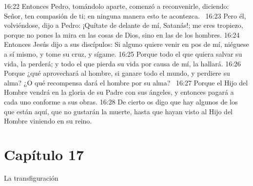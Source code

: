 16:22 Entonces Pedro, tomándolo aparte, comenzó a reconvenirle, diciendo: Señor, ten compasión de ti; en ninguna manera esto te acontezca.  
16:23 Pero él, volviéndose, dijo a Pedro: ¡Quítate de delante de mí, Satanás!; me eres tropiezo, porque no pones la mira en las cosas de Dios, sino en las de los hombres. 
16:24 Entonces Jesús dijo a sus discípulos: Si alguno quiere venir en pos de mí, niéguese a sí mismo, y tome su cruz, y sígame. 
16:25 Porque todo el que quiera salvar su vida, la perderá; y todo el que pierda su vida por causa de mí, la hallará. 
16:26 Porque ¿qué aprovechará al hombre, si ganare todo el mundo, y perdiere su alma? ¿O qué recompensa dará el hombre por su alma?  
16:27 Porque el Hijo del Hombre vendrá en la gloria de su Padre con sus ángeles, y entonces pagará a cada uno conforme a sus obras. 
16:28 De cierto os digo que hay algunos de los que están aquí, que no gustarán la muerte, hasta que hayan visto al Hijo del Hombre viniendo en su reino. 
\section*{Capítulo 17}
La transfiguración  

